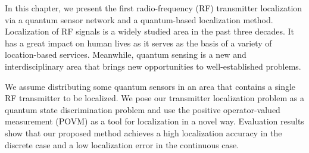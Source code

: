 In this chapter, we present the first radio-frequency (RF) transmitter localization via a quantum sensor network and a quantum-based localization method. 
Localization of RF signals is a widely studied area in the past three decades. 
It has a great impact on human lives as
it serves as the basis of a variety of location-based services.
Meanwhile, quantum sensing is a new and interdisciplinary area that brings new opportunities to well-established problems.

We assume distributing some quantum sensors in an area that contains a single RF transmitter to be localized. 
We pose our transmitter localization problem as a quantum state discrimination problem and use the positive operator-valued measurement (POVM) as a tool for localization in a novel way.
Evaluation results show that our proposed method achieves a high localization accuracy in the discrete case and a low localization error in the continuous case.

